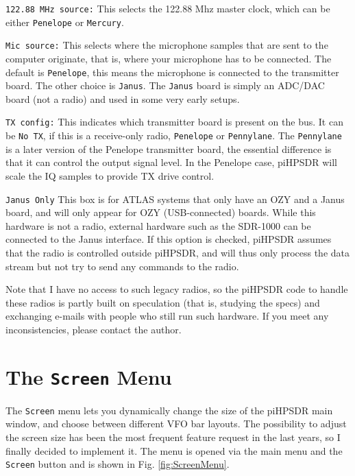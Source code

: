 \documentclass[12pt]{book}
\def\rett#1{\texttt{\color{red}#1}}
\def\bltt#1{\texttt{\color{blue}#1}}
\begin{document}
\rett{122.88 MHz source:} This selects the 122.88 Mhz master clock, which can be either
\texttt{Penelope} or \texttt{Mercury}.

\rett{Mic source:} This selects where the microphone samples that are sent to the computer
originate, that is, where your microphone has to be connected. The default is
\texttt{Penelope}, this means the microphone is connected to the transmitter board. The
other choice is \texttt{Janus}. The \texttt{Janus} board is simply an ADC/DAC board (not
a radio) and used in some very early setups.

\rett{TX config:} This indicates which transmitter board is present on the bus. It can
be \texttt{No TX}, if this is a receive-only radio, \texttt{Penelope} or \texttt{Pennylane}.
The \texttt{Pennylane} is a later version of the Penelope transmitter board, the essential
difference is that it can control the output signal level. In the Penelope case,
piHPSDR will scale the IQ samples to provide TX drive control.

\rett{Janus Only} This box is for ATLAS systems that only have an OZY and a Janus board,
and will only appear for OZY (USB-connected) boards. While this hardware is not a radio,
external hardware such as the SDR-1000 can be connected to the Janus interface. If this
option is checked, piHPSDR assumes that the radio is controlled outside piHPSDR, and
will thus only process the data stream but not try to send any commands to the radio.

Note that I have no access to such legacy radios, so the piHPSDR code to handle these radios
is partly built on speculation (that is, studying the specs) and exchanging e-mails with
people who still run such hardware. If you meet any inconsistencies, please contact
the author.

\section{The \texttt{Screen} Menu}

The \bltt{Screen} menu lets you dynamically change the size of the piHPSDR main
window, and choose between different VFO bar layouts. The possibility to adjust
the screen size has been the most frequent feature request in the last years,
so I finally decided to implement it. The menu is opened
via the main menu and the \bltt{Screen} button and is shown in Fig. \ref{fig:ScreenMenu}.
\end{document}
